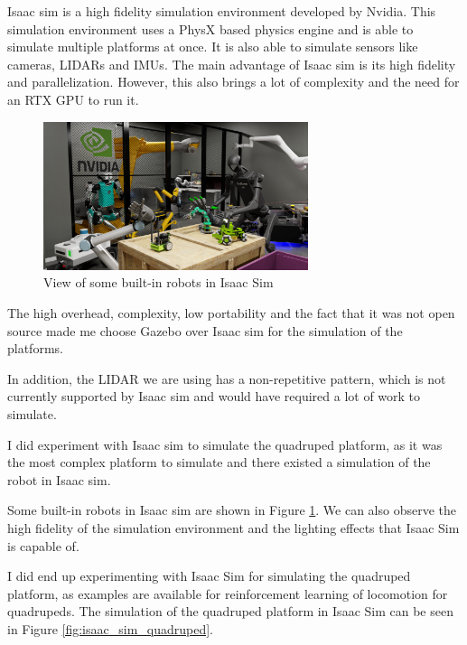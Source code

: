 \documentclass[11pt]{article}
\begin{document}
            Isaac sim is a high fidelity simulation environment developed by Nvidia. This simulation environment uses a PhysX based physics engine and is able to simulate multiple platforms at once. It is also able to simulate sensors like cameras, LIDARs and IMUs. The main advantage of Isaac sim is its high fidelity and parallelization. However, this also brings a lot of complexity and the need for an RTX GPU to run it.
            
            \begin{figure}[H]
                \centering
                \includegraphics[width=0.69\textwidth]{Images/isaac_sim.png}
                \caption{View of some built-in robots in Isaac Sim}
                \label{fig:isaac_sim_robots}
            \end{figure}
            
            The high overhead, complexity, low portability and the fact that it was not open source made me choose Gazebo over Isaac sim for the simulation of the platforms.

            In addition, the LIDAR we are using has a non-repetitive pattern, which is not currently supported by Isaac sim and would have required a lot of work to simulate.

            I did experiment with Isaac sim to simulate the quadruped platform, as it was the most complex platform to simulate and there existed a simulation of the robot in Isaac sim.

            Some built-in robots in Isaac sim are shown in Figure \ref{fig:isaac_sim_robots}. We can also observe the high fidelity of the simulation environment and the lighting effects that Isaac Sim is capable of.

            I did end up experimenting with Isaac Sim for simulating the quadruped platform, as examples are available for reinforcement learning of locomotion for quadrupeds. The simulation of the quadruped platform in Isaac Sim can be seen in Figure \ref{fig:isaac_sim_quadruped}.
\end{document}
